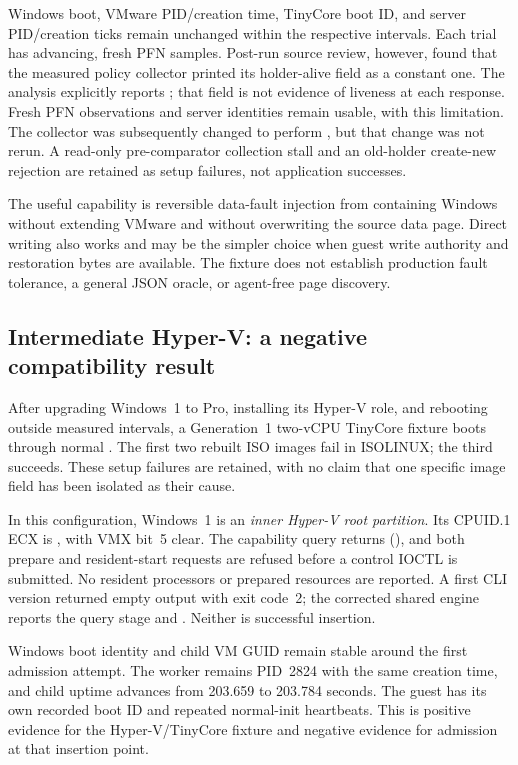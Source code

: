 Windows boot, VMware PID/creation time, TinyCore boot ID, and server
PID/creation ticks remain unchanged within the respective intervals. Each
trial has advancing, fresh PFN samples. Post-run source review, however, found
that the measured policy collector printed its holder-alive field as a constant
one. The analysis explicitly reports ;
that field is not evidence of liveness at each response. Fresh PFN observations
and server identities remain usable, with this limitation. The collector was
subsequently changed to perform , but that change was not rerun.
A read-only pre-comparator collection stall and an old-holder create-new
rejection are retained as setup failures, not application successes.

The useful capability is reversible data-fault injection from containing
Windows without extending VMware and without overwriting the source data page.
Direct writing also works and may be the simpler choice when guest write
authority and restoration bytes are available. The fixture does not establish
production fault tolerance, a general JSON oracle, or agent-free page discovery.

\subsection{Intermediate Hyper-V: a negative compatibility result}
\label{sec:hyperv}
After upgrading Windows~1 to Pro, installing its Hyper-V role, and rebooting
outside measured intervals, a Generation~1 two-vCPU TinyCore fixture boots
through normal . The first two rebuilt ISO images fail in ISOLINUX;
the third succeeds. These setup failures are retained, with no claim that one
specific image field has been isolated as their cause.

In this configuration, Windows~1 is an \emph{inner Hyper-V root partition}.
Its CPUID.1 ECX is , with VMX bit~5 clear. The \ks{} capability
query returns  (), and both prepare
and resident-start requests are refused before a control IOCTL is submitted.
No resident processors or prepared resources are reported. A first CLI version
returned empty output with exit code~2; the corrected shared engine reports
the query stage and . Neither is successful insertion.

Windows boot identity and child VM GUID remain stable around the first
admission attempt. The worker remains PID~2824 with the same creation time,
and child uptime advances from 203.659 to 203.784 seconds. The guest has its own
recorded boot ID and repeated normal-init heartbeats. This is positive evidence
for the Hyper-V/TinyCore fixture and negative evidence for \ks{} admission at
that insertion point.

